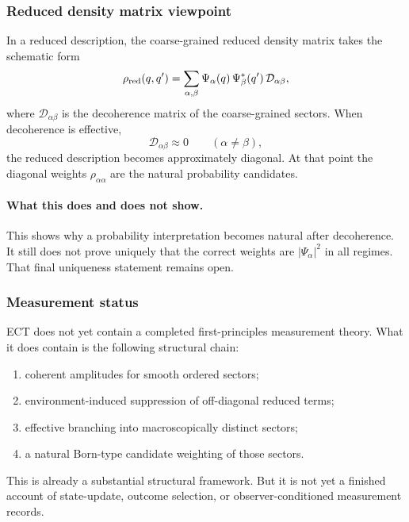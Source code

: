 \documentclass[11pt,a4paper]{article}
\numberwithin{equation}{section}
\begin{document}
\subsubsection*{Reduced density matrix viewpoint}

In a reduced description, the coarse-grained reduced density matrix
takes the schematic form
\begin{equation}
  \label{eq:qs_rho_red}
  \rho_{\rm red}(q,q')
  =
  \sum_{\alpha,\beta}
  \Psi_\alpha(q)\,\Psi_\beta^*(q')\,
  \mathcal{D}_{\alpha\beta},
\end{equation}
where $\mathcal{D}_{\alpha\beta}$ is the decoherence matrix of the
coarse-grained sectors.
When decoherence is effective,
\begin{equation}
  \label{eq:qs_diag_limit}
  \mathcal{D}_{\alpha\beta} \approx 0
  \qquad (\alpha\neq\beta),
\end{equation}
the reduced description becomes approximately diagonal.
At that point the diagonal weights $\rho_{\alpha\alpha}$ are the
natural probability candidates.

\paragraph{What this does and does not show.}
This shows why a probability interpretation becomes natural after
decoherence.
It still does not prove uniquely that the correct weights are
$|\Psi_\alpha|^2$ in all regimes.
That final uniqueness statement remains open.

\subsubsection*{Measurement status}

ECT does not yet contain a completed first-principles measurement
theory.
What it does contain is the following structural chain:
\begin{enumerate}[label=(\roman*)]
  \item coherent amplitudes for smooth ordered sectors;
  \item environment-induced suppression of off-diagonal reduced terms;
  \item effective branching into macroscopically distinct sectors;
  \item a natural Born-type candidate weighting of those sectors.
\end{enumerate}
This is already a substantial structural framework.
But it is not yet a finished account of state-update, outcome
selection, or observer-conditioned measurement records.
\end{document}
